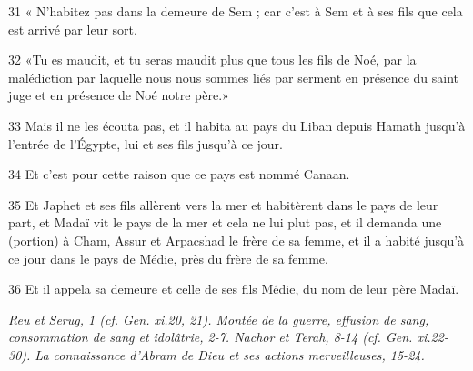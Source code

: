 \par 31 « N'habitez pas dans la demeure de Sem ; car c'est à Sem et à ses fils que cela est arrivé par leur sort.
\par 32 «Tu es maudit, et tu seras maudit plus que tous les fils de Noé, par la malédiction par laquelle nous nous sommes liés par serment en présence du saint juge et en présence de Noé notre père.»
\par 33 Mais il ne les écouta pas, et il habita au pays du Liban depuis Hamath jusqu'à l'entrée de l'Égypte, lui et ses fils jusqu'à ce jour.
\par 34 Et c'est pour cette raison que ce pays est nommé Canaan.
\par 35 Et Japhet et ses fils allèrent vers la mer et habitèrent dans le pays de leur part, et Madaï vit le pays de la mer et cela ne lui plut pas, et il demanda une (portion) à Cham, Assur et Arpacshad le frère de sa femme, et il a habité jusqu'à ce jour dans le pays de Médie, près du frère de sa femme.
\par 36 Et il appela sa demeure et celle de ses fils Médie, du nom de leur père Madaï.


\par \textit{Reu et Serug, 1 (cf. Gen. xi.20, 21). Montée de la guerre, effusion de sang, consommation de sang et idolâtrie, 2-7. Nachor et Terah, 8-14 (cf. Gen. xi.22-30). La connaissance d'Abram de Dieu et ses actions merveilleuses, 15-24.}

